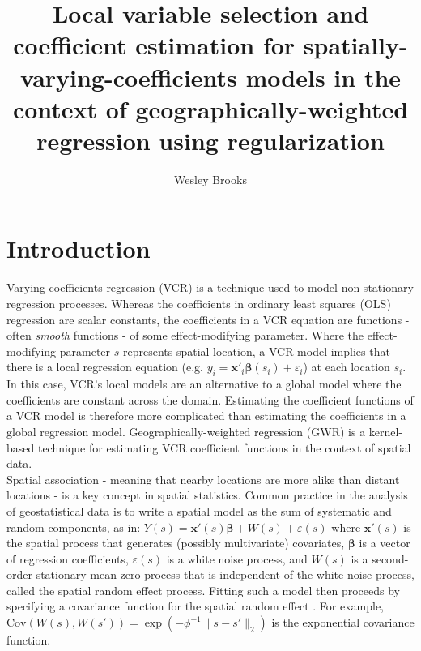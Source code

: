 \documentclass[authoryear, review, 11pt]{elsarticle}
\title{Local variable selection and coefficient estimation for spatially-varying-coefficients models in the context of geographically-weighted regression using regularization}
\author{Wesley Brooks}
\date{}                                           %
\begin{document}
\maketitle





\section{Introduction}
	Varying-coefficients regression (VCR) \citep{Hastie:1993a} is a technique used to model non-stationary regression processes. Whereas the coefficients in ordinary least squares (OLS) regression are scalar constants, the coefficients in a VCR equation are functions - often \emph{smooth} functions - of some effect-modifying parameter. Where the effect-modifying parameter $s$ represents spatial location, a VCR model implies that there is a local regression equation (e.g. $y_i = \bm{x}'_i\bm{\beta}(s_i) + \varepsilon_i$) at each location $s_i$. In this case, VCR's local models are an alternative to a global model where the coefficients are constant across the domain. Estimating the coefficient functions of a VCR model is therefore more complicated than estimating the coefficients in a global regression model. Geographically-weighted regression (GWR) \citep{Brundson:1998a, Fotheringham:2002} is a kernel-based technique for estimating VCR coefficient functions in the context of spatial data.\\
	
	Spatial association - meaning that nearby locations are more alike than distant locations - is a key concept in spatial statistics. Common practice in the analysis of geostatistical data \citep{Cressie:1993} is to write a spatial model as the sum of systematic and random components, as in: $Y(s) = \bm{x}'(s)\bm{\beta} + W(s) + \varepsilon(s)$ where $\bm{x}'(s)$ is the spatial process that generates (possibly multivariate) covariates, $\bm{\beta}$ is a vector of regression coefficients, $\varepsilon(s)$ is a white noise process, and $W(s)$ is a second-order stationary mean-zero process that is independent of the white noise process, called the spatial random effect process. Fitting such a model then proceeds by specifying a covariance function for the spatial random effect \citep{Diggle:2007}. For example, $\text{Cov}(W(s), W(s')) = \exp\left(-\phi^{-1} \|s - s'\|_2 \right)$ is the exponential covariance function.\\
\end{document}
